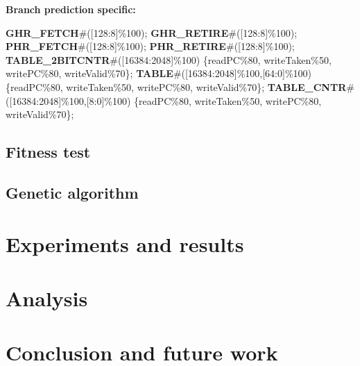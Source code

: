 \documentclass[conference]{IEEEtran}
\begin{document}
\textbf{Branch prediction specific:}
\begin{algorithmic}
\STATE \textbf{GHR\_FETCH}\#([128:8]\%100);
\STATE \textbf{GHR\_RETIRE}\#([128:8]\%100);
\STATE \textbf{PHR\_FETCH}\#([128:8]\%100);
\STATE \textbf{PHR\_RETIRE}\#([128:8]\%100);
\STATE \textbf{TABLE\_2BITCNTR}\#([16384:2048]\%100) 
\STATE \{readPC\%80, writeTaken\%50, writePC\%80, writeValid\%70\};
\STATE \textbf{TABLE}\#([16384:2048]\%100,[64:0]\%100) 
\STATE \{readPC\%80, writeTaken\%50, writePC\%80, writeValid\%70\};
\STATE \textbf{TABLE\_CNTR}\#([16384:2048]\%100,[8:0]\%100) 
\STATE \{readPC\%80, writeTaken\%50, writePC\%80, writeValid\%70\};
\end{algorithmic}



\subsection{Fitness test}
\subsection{Genetic algorithm}

\section{Experiments and results}

\section{Analysis}

\section{Conclusion and future work}


\end{document}
